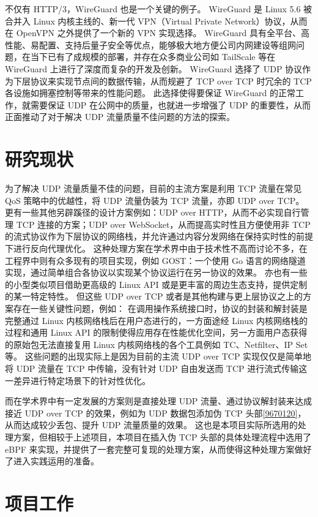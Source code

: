 不仅有 HTTP/3，WireGuard 也是一个关键的例子。
WireGuard 是 Linux 5.6 被合并入 Linux 内核主线的、新一代 VPN（Virtual Private Network）协议，从而在 OpenVPN 之外提供了一个新的 VPN 实现选择。
WireGuard 具有全平台、高性能、易配置、支持后量子安全\cite{9519445}等优点，能够极大地方便公司内网建设等组网问题，在当下已有了成规模的部署，并存在众多商业公司如 TailScale 等在 WireGuard 上进行了深度而复杂的开发及创新。
WireGuard 选择了 UDP 协议作为下层协议来实现节点间的数据传输，从而规避了 TCP over TCP 时冗余的 TCP 各设施如拥塞控制等带来的性能问题。
此选择使得要保证 WireGuard 的正常工作，就需要保证 UDP 在公网中的质量，也就进一步增强了 UDP 的重要性，从而正面推动了对于解决 UDP 流量质量不佳问题的方法的探索。

\section{研究现状}

为了解决 UDP 流量质量不佳的问题，目前的主流方案是利用 TCP 流量在常见 QoS 策略中的优越性，将 UDP 流量伪装为 TCP 流量，亦即 UDP over TCP。
更有一些其他另辟蹊径的设计方案例如：UDP over HTTP，从而不必实现自行管理 TCP 连接的方案；UDP over WebSocket，从而提高实时性且方便使用非 TCP 的流式协议作为下层协议的网络栈，并允许通过内容分发网络在保持实时性的前提下进行反向代理优化。
这种处理方案在学术界中由于技术性不高而讨论不多，在工程界中则有众多现有的项目实现，例如 GOST：一个使用 Go 语言的网络隧道实现，通过简单组合各协议以实现某个协议运行在另一协议的效果。
亦也有一些的小型类似项目借助更高级的 Linux API 或是更丰富的周边生态支持，提供定制的某一特定特性。
但这些 UDP over TCP 或者是其他构建与更上层协议之上的方案存在一些关键性问题，例如：
在调用操作系统接口时，协议的封装和解封装是完整通过 Linux 内核网络栈后在用户态进行的，一方面途经 Linux 内核网络栈的过程和通用 Linux API 的限制使得应用存在性能优化空间，另一方面用户态获得的原始包无法直接复用 Linux 内核网络栈的各个工具例如 TC、Netfilter、IP Set 等。
这些问题的出现实际上是因为目前的主流 UDP over TCP 实现仅仅是简单地将 UDP 流量在 TCP 中传输，没有针对 UDP 自由发送而 TCP 进行流式传输这一差异进行特定场景下的针对性优化。

而在学术界中有一定发展的方案则是直接处理 UDP 流量、通过协议解封装来达成接近 UDP over TCP 的效果，例如为 UDP 数据包添加伪 TCP 头部\ref{9670120}，从而达成较少丢包、提升 UDP 流量质量的效果。
这也是本项目实际所选用的处理方案，但相较于上述项目，本项目在插入伪 TCP 头部的具体处理流程中选用了 eBPF 来实现，并提供了一套完整可复现的处理方案，从而使得这种处理方案做好了进入实践运用的准备。

\section{项目工作}

